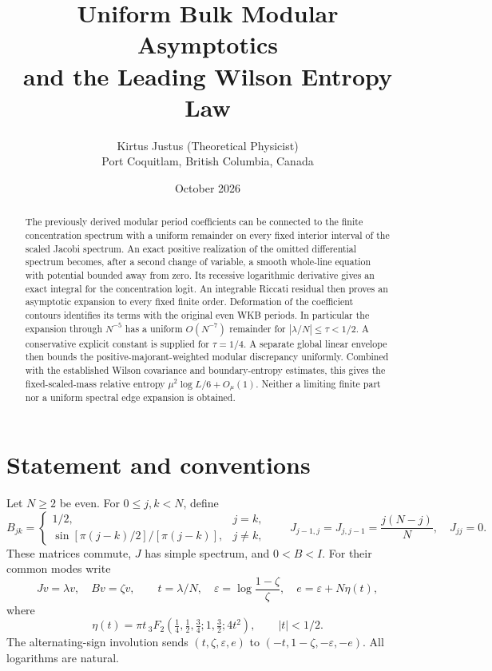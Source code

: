 \documentclass[10pt]{article}
\title{Uniform Bulk Modular Asymptotics\\and the Leading Wilson Entropy Law}
\author{Kirtus Justus (Theoretical Physicist)\\\small Port Coquitlam, British Columbia, Canada}
\date{October 2026}
\begin{document}
\maketitle
\begin{abstract}
The previously derived modular period coefficients can be connected to the
finite concentration spectrum with a uniform remainder on every fixed
interior interval of the scaled Jacobi spectrum. An exact positive
realization of the omitted differential spectrum becomes, after a second
change of variable, a smooth whole-line equation with potential bounded
away from zero. Its recessive logarithmic derivative gives an exact
integral for the concentration logit. An integrable Riccati residual
then proves an asymptotic expansion to every fixed finite order.
Deformation of the coefficient contours identifies its terms with the
original even WKB periods. In particular the expansion through $N^{-5}$
has a uniform $O(N^{-7})$ remainder for $|\lambda/N|\le\tau<1/2$.
A conservative explicit constant is supplied for $\tau=1/4$.
A separate global linear envelope then bounds the positive-majorant-weighted
modular discrepancy uniformly. Combined with the established Wilson
covariance and boundary-entropy estimates, this gives the fixed-scaled-mass
relative entropy $\mu^2\log L/6+O_\mu(1)$. Neither a limiting finite part
nor a uniform spectral edge expansion is obtained.
\end{abstract}

\section{Statement and conventions}

Let $N\ge2$ be even. For $0\le j,k<N$, define
\begin{equation}
B_{jk}=\begin{cases}1/2,&j=k,\\
\sin[\pi(j-k)/2]/[\pi(j-k)],&j\ne k,\end{cases}
\qquad J_{j-1,j}=J_{j,j-1}=\frac{j(N-j)}N,\quad J_{jj}=0.
\label{eq:model}
\end{equation}
These matrices commute, $J$ has simple spectrum, and $0<B<I$.
For their common modes write
\begin{equation}
Jv=\lambda v,\quad Bv=\zeta v,\qquad
t=\lambda/N,\quad \varepsilon=\log\frac{1-\zeta}{\zeta},\quad
e=\varepsilon+N\eta(t),
\label{eq:conventions}
\end{equation}
where
\begin{equation}
\eta(t)=\pi t\,{}_3F_2\!\left(\tfrac14,\tfrac12,\tfrac34;1,\tfrac32;4t^2\right),
\qquad |t|<1/2.
\label{eq:eta}
\end{equation}
The alternating-sign involution sends $(t,\zeta,\varepsilon,e)$ to
$(-t,1-\zeta,-\varepsilon,-e)$. All logarithms are natural.
\end{document}
